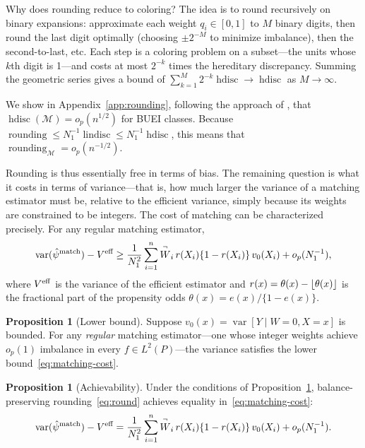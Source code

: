 \documentclass{article}
\theoremstyle{definition}
\newtheorem{proposition}[theorem]{Proposition}
\DeclareMathOperator{\Var}{var}
\DeclarePairedDelimiter\floor{\lfloor}{\rfloor}
\DeclareMathOperator{\roundingerror}{rounding}
\DeclareMathOperator{\hdisc}{hdisc}
\DeclareMathOperator{\lindisc}{lindisc}
\newcommand{\model}{\mathcal{M}}
\newcommand{\<}{\langle}
\renewcommand{\>}{\rangle}
\begin{document}
Why does rounding reduce to coloring? The idea is to round recursively on binary expansions: approximate each weight $q_i \in [0,1]$ to $M$ binary digits, then round the last digit optimally (choosing $\pm 2^{-M}$ to minimize imbalance), then the second-to-last, etc. Each step is a coloring problem on a subset---the units whose $k$th digit is 1---and costs at most $2^{-k}$ times the hereditary discrepancy. Summing the geometric series gives a bound of $\sum_{k=1}^M 2^{-k} \hdisc \to \hdisc$ as $M \to \infty$.

We show in Appendix~\ref{app:rounding}, following the approach of \citet{mendelson2011discrepancy}, that $\hdisc(\model) = o_p(n^{1/2})$ for BUEI classes. Because $\roundingerror \le N_1^{-1} \lindisc \le N_1^{-1} \hdisc$, this means that $\roundingerror_\model = o_p(n^{-1/2})$.

Rounding is thus essentially free in terms of bias. The remaining question is what it costs in terms of variance---that is, how much larger the variance of a matching estimator must be, relative to the efficient variance, simply because its weights are constrained to be integers. The cost of matching can be characterized precisely. For any regular matching estimator,
\begin{equation}
\label{eq:matching-cost}
\Var(\hat\psi^{\textup{match}}) - V^{\textup{eff}} \ge \frac{1}{N_1^2}\sum_{i=1}^n \overset{\neg}{W}_i\, r(X_i)\{1-r(X_i)\}\,v_0(X_i) + o_p(N_1^{-1}),
\end{equation}
where $V^{\textup{eff}}$ is the variance of the efficient estimator and $r(x) = \theta(x) - \floor{\theta(x)}$ is the fractional part of the propensity odds $\theta(x) = e(x)/\{1-e(x)\}$.

\begin{proposition}[Lower bound]
\label{prop:matching-cost}
Suppose $v_0(x) = \Var[Y \mid W=0, X=x]$ is bounded. For any \emph{regular} matching estimator---one whose integer weights achieve $o_p(1)$ imbalance in every $f \in L^2(P)$---the variance satisfies the lower bound~\eqref{eq:matching-cost}.
\end{proposition}

\begin{proposition}[Achievability]
\label{prop:matching-achievable}
Under the conditions of Proposition~\ref{prop:matching-cost}, balance-preserving rounding~\eqref{eq:round} achieves equality in~\eqref{eq:matching-cost}:
\[
\Var(\hat\psi^{\textup{match}}) - V^{\textup{eff}} = \frac{1}{N_1^2}\sum_{i=1}^n \overset{\neg}{W}_i\, r(X_i)\{1-r(X_i)\}\,v_0(X_i) + o_p(N_1^{-1}).
\]
\end{proposition}
\end{document}
